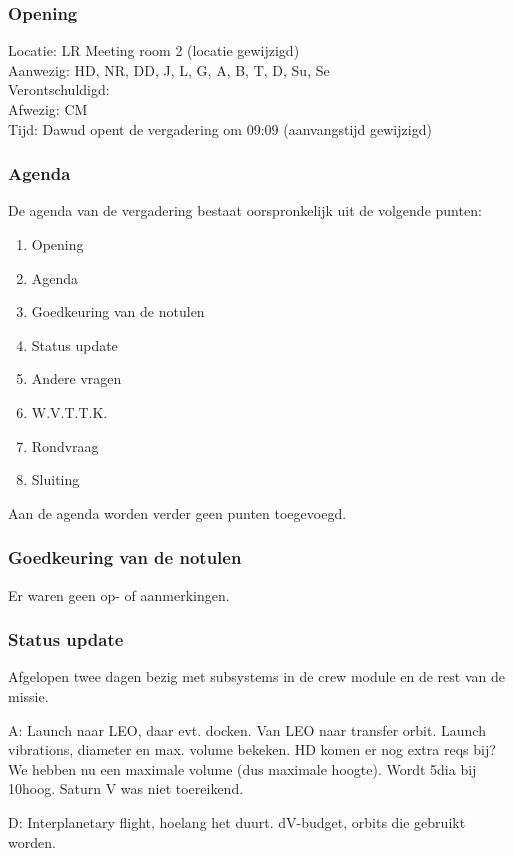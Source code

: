\subsubsection{Opening}
Locatie: LR Meeting room 2 (locatie gewijzigd)\\
Aanwezig: HD, NR, DD, J, L, G, A, B, T, D, Su, Se\\
Verontschuldigd: \\
Afwezig: CM \\
Tijd: Dawud opent de vergadering om 09:09 (aanvangstijd gewijzigd)\\

\subsubsection{Agenda}
De agenda van de vergadering bestaat oorspronkelijk uit de volgende punten:
\begin{enumerate}
\item Opening
\item Agenda
\item Goedkeuring van de notulen
\item Status update
\item Andere vragen
\item W.V.T.T.K.
\item Rondvraag
\item Sluiting
\end{enumerate}

Aan de agenda worden verder geen punten toegevoegd.

\subsubsection{Goedkeuring van de notulen}
Er waren geen op- of aanmerkingen.

\subsubsection{Status update}
Afgelopen twee dagen bezig met subsystems in de crew module en de rest van de missie.

A: Launch naar LEO, daar evt. docken. Van LEO naar transfer orbit. Launch vibrations, diameter en max. volume bekeken. HD komen er nog extra reqs bij? We hebben nu een maximale volume (dus maximale hoogte). Wordt 5dia bij 10hoog. Saturn V was niet toereikend.

D: Interplanetary flight, hoelang het duurt. dV-budget, orbits die gebruikt worden.

